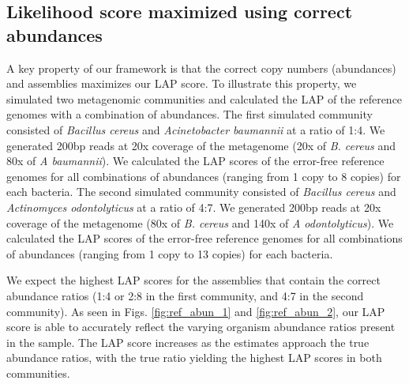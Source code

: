 \subsection{Likelihood score maximized using correct abundances}
A key property of our framework is that the correct copy numbers (abundances) and assemblies maximizes our LAP score.
To illustrate this property, we simulated two metagenomic communities and calculated the LAP of the reference genomes with a combination of abundances.
The first simulated community consisted of \emph{Bacillus cereus} and \emph{Acinetobacter baumannii} at a ratio of 1:4.
We generated 200bp reads at 20x coverage of the metagenome (20x of \emph{B. cereus} and 80x of \emph{A baumannii}).
We calculated the LAP scores of the error-free reference genomes for all combinations of abundances (ranging from 1 copy to 8 copies) for each bacteria.
The second simulated community consisted of \emph{Bacillus cereus} and \emph{Actinomyces odontolyticus} at a ratio of 4:7.
We generated 200bp reads at 20x coverage of the metagenome (80x of \emph{B. cereus} and 140x of \emph{A odontolyticus}).
We calculated the LAP scores of the error-free reference genomes for all combinations of abundances (ranging from 1 copy to 13 copies) for each bacteria.



We expect the highest LAP scores for the assemblies that contain the correct abundance ratios (1:4 or 2:8 in the first community, and 4:7 in the second community).
As seen in Figs. \ref{fig:ref_abun_1} and \ref{fig:ref_abun_2}, our LAP score is able to accurately reflect the varying organism abundance ratios present in the sample.
The LAP score increases as the estimates approach the true abundance ratios, with the true ratio yielding the highest LAP scores in both communities.

